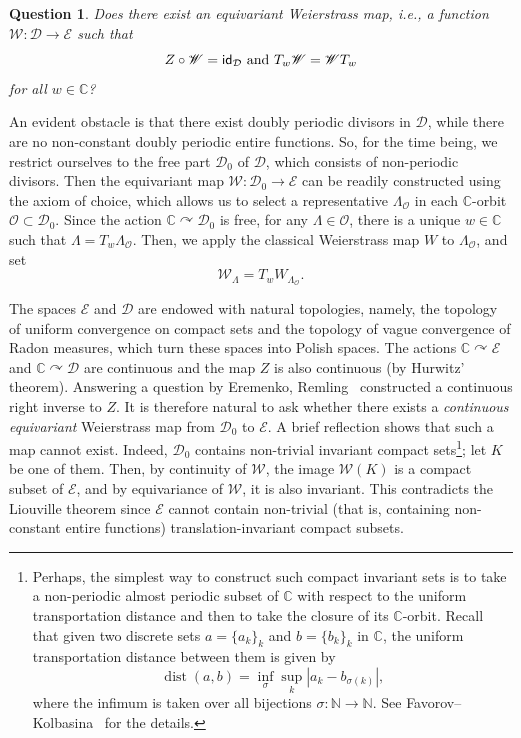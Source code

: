 \documentclass[11pt]{paper}
\newtheorem*{question*}{Question}
\newcommand{\bC}{\mathbb C}
\newcommand{\bN}{\mathbb N}
\newcommand{\cE}{\mathcal E}
\newcommand{\cD}{\mathcal D}
\newcommand{\sW}{\mathscr W}
\begin{document}
\begin{question*} Does there exist an equivariant Weierstrass map, i.e., a function $\sW\colon \cD\to \cE$ such that
\[ Z \circ \sW = {\sf id}_{\cD} \ {\rm and}\  T_w \sW = \sW  T_w\]
for all $w\in\bC$?
\end{question*}

An evident obstacle is that there exist doubly periodic divisors in $\cD$, while there are no
non-constant doubly periodic entire functions. So, for the time being, we restrict ourselves to the
free part $\cD_0$ of $\cD$, which consists of non-periodic divisors.  Then the equivariant map
$\sW\colon \cD_0\to \cE$ can be readily constructed using the axiom of choice, which allows us to
select a representative $\Lambda_\mathcal O$ in each $\bC$-orbit $\mathcal O\subset\cD_0$. Since the
action $\bC\curvearrowright \cD_0$ is free, for any $\Lambda\in\mathcal O$, there is a unique
$w\in\bC$ such that $\Lambda=T_w \Lambda_\mathcal O$.  Then, we apply the classical Weierstrass map
$W$ to $\Lambda_\mathcal O$, and set \[ \sW_\Lambda = T_{w} W_{\Lambda_\mathcal O}. \]

The spaces $\cE$ and $\cD$ are endowed with natural topologies, namely, the topology of uniform
convergence on compact sets and the topology of vague convergence of Radon measures, which turn
these spaces into Polish spaces.  The actions $\bC\curvearrowright \cE$ and
$\bC\curvearrowright \cD$ are continuous and the map $Z$ is also continuous (by Hurwitz' theorem).
Answering a question by Eremenko, Remling~\cite{Remling} constructed a continuous right inverse to $Z$.
It is therefore natural to ask whether there exists a {\em continuous equivariant} Weierstrass map
from $\cD_0$ to $\cE$.  A brief reflection shows that such a map cannot exist. Indeed, $\cD_0$
contains non-trivial invariant compact sets\footnote {Perhaps, the simplest way to construct such
  compact invariant sets is to take a non-periodic almost periodic subset of $\bC$ with respect to
  the uniform transportation distance and then to take the closure of its $\bC$-orbit.  Recall that
  given two discrete sets $a=\{a_k\}_k$ and $b=\{b_k\}_k$ in $\bC$, the uniform transportation
  distance between them is given by
\[
\operatorname{dist}(a, b) =  \inf_\sigma  \sup_k |a_k - b_{\sigma(k)}|,
\]
where the infimum is taken over all bijections $\sigma\colon \bN\to \bN$.  See
Favorov--Kolbasina~\cite{FavorovKolbasina} for the details.  }; let $K$ be one of them. Then, by
continuity of $\sW$, the image $\sW(K)$ is a compact subset of $\cE$, and by equivariance of $\sW$,
it is also invariant. This contradicts the Liouville theorem since $\cE$ cannot contain non-trivial
(that is, containing non-constant entire functions) translation-invariant compact subsets.
\end{document}
